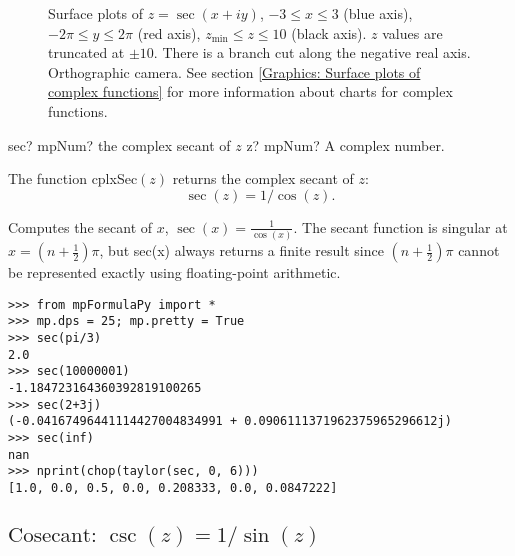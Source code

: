 \begin{figure}[ht]%
	\centering
	\qquad
	\caption[Complex Secant]{Surface plots of $z = \sec(x + iy)$, $-3 \leq x \leq 3$ (blue axis), $-2 \pi \leq y \leq 2\pi$ (red axis), $z_{\text{min}} \leq z \leq 10$ (black axis). $z$ values are truncated at $\pm 10$. There is a branch cut along the negative real axis. Orthographic camera. See section \ref{Graphics: Surface plots of complex functions} for more information about charts for complex functions.} 
	\label{fig:Complex Secant}%
\end{figure}

\begin{mpFunctionsExtract}
	\mpFunctionOne
	{sec? mpNum? the complex secant of $z$}
	{z? mpNum? A complex number.}
\end{mpFunctionsExtract}

\vspace{0.3cm}
The function \textsf{cplxSec$(z)$} returns the complex secant of $z$: 
\begin{equation}
	\sec(z) = 1/\cos(z).
\end{equation}


Computes the secant of $x$, $\sec(x)=\frac{1}{\cos(x)}$. The secant function is singular at $x=(n+\tfrac{1}{2})\pi$, but sec(x) always returns a finite result since $(n+\tfrac{1}{2})\pi$ cannot be represented exactly using floating-point arithmetic.

\begin{lstlisting}
>>> from mpFormulaPy import *
>>> mp.dps = 25; mp.pretty = True
>>> sec(pi/3)
2.0
>>> sec(10000001)
-1.184723164360392819100265
>>> sec(2+3j)
(-0.04167496441114427004834991 + 0.0906111371962375965296612j)
>>> sec(inf)
nan
>>> nprint(chop(taylor(sec, 0, 6)))
[1.0, 0.0, 0.5, 0.0, 0.208333, 0.0, 0.0847222]
\end{lstlisting}




\newpage
\subsection{\texorpdfstring{$\text{Cosecant: }\csc(z) = 1/\sin(z)$}{csc}}


